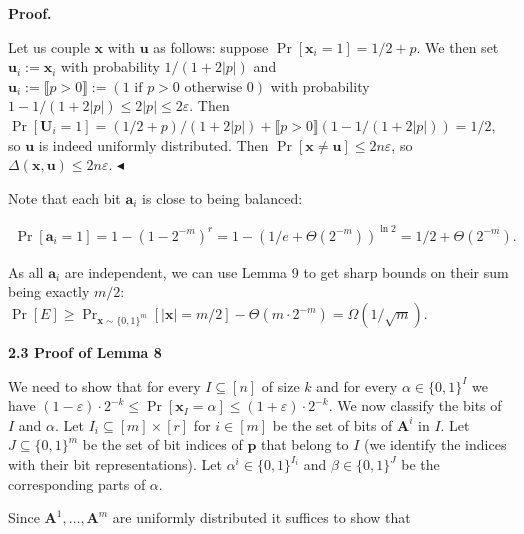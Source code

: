 \par\medskip\noindent\textbf{Proof.}\par




Let us couple $\bm{x}$ with $\bm{u}$ as follows:
suppose $\Pr[\bm{x}_{i}=1]=1/2+p$. We then set $\bm{u}_{i}:=\bm{x}_{i}$ with
probability $1/(1+2|p|)$ and $\bm{u}_{i}:=\llbracket p>0\rrbracket:=(1\text{ if }p>0\text{ otherwise }0)$
with probability $1-1/(1+2|p|)\leq 2|p|\leq 2\varepsilon$.
Then $\Pr[\bm{U}_{i}=1]=(1/2+p)/(1+2|p|)+\llbracket p>0\rrbracket(1-1/(1+2|p|))=1/2$, so $\bm{u}$ is indeed uniformly distributed.
Then $\Pr[\bm{x}\neq\bm{u}]\leq 2n\varepsilon$, so $\Delta(\bm{x},\bm{u})\leq 2n\varepsilon$.
$\blacktriangleleft$\par




Note that each bit $\bm{a}_{i}$ is close to being balanced:\par


\[\begin{gathered}
\Pr[\bm{a}_{i}=1]=1-(1-2^{-m})^{r}=1-(1/e+\Theta(2^{-m}))^{\ln 2}=1/2+\Theta(2^{-m}).
\end{gathered}\]


As all $\bm{a}_{i}$ are independent, we can use Lemma 9 to get sharp bounds on their sum being exactly $m/2$: $\Pr[E]\geq\Pr_{\bm{x}\sim\{0,1\}^{m}}[|\bm{x}|=m/2]-\Theta(m\cdot 2^{-m})=\Omega(1/\sqrt{m})$.\par






\par\medskip\noindent\textbf{
2.3 Proof of Lemma 8
}\par




We need to show that for every $I\subseteq[n]$ of size $k$ and for every $\alpha\in\{0,1\}^{I}$ we
have $(1-\varepsilon)\cdot 2^{-k}\leq\Pr[\bm{x}_{I}=\alpha]\leq(1+\varepsilon)\cdot 2^{-k}$. We
now classify the bits of $I$ and $\alpha$. Let $I_{i}\subseteq[m]\times[r]$ for $i\in[m]$ be the set
of bits of $\bm{A}^{i}$ in $I$. Let $J\subseteq\{0,1\}^{m}$ be the set of bit indices of $\bm{p}$ that
belong to $I$ (we identify the indices with their bit representations). Let $\alpha^{i}\in\{0,1\}^{I_{i}}$
and $\beta\in\{0,1\}^{J}$ be the corresponding parts of $\alpha$.\par




Since $\bm{A}^{1},\dots,\bm{A}^{m}$ are uniformly distributed it suffices to show that\par


